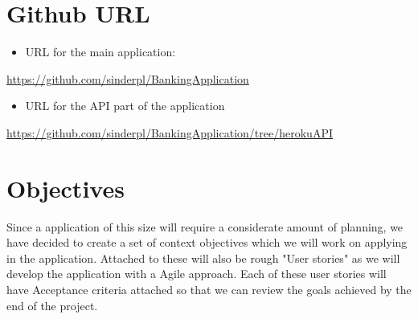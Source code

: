     
\section{Github URL} 
    \begin{itemize}
    \item URL for the main application:
    \end{itemize}
    \url{https://github.com/sinderpl/BankingApplication}
    \begin{itemize}
    \item URL for the API part of the application
    \end{itemize} 
    \url{https://github.com/sinderpl/BankingApplication/tree/herokuAPI}
    
    
    
    
\section{Objectives}
    Since a application of this size will require a considerate amount of planning, we have decided to create a set of context objectives which we will work on applying in the application. Attached to these will also be rough "User stories" as we will develop the application with a Agile approach.\cite{userStories} Each of these user stories will have Acceptance criteria attached so that we can review the goals achieved by the end of the project.
